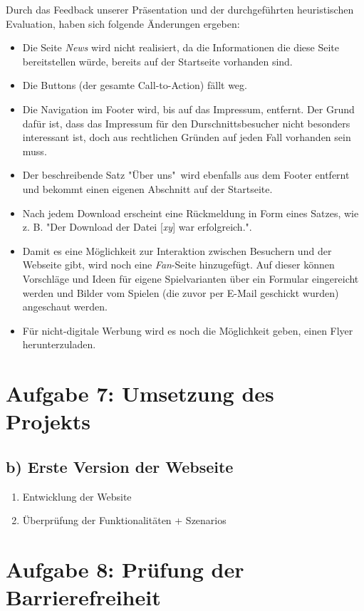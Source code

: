 \documentclass{scrartcl}
\begin{document}
Durch das Feedback unserer Präsentation und der durchgeführten heuristischen Evaluation, haben sich folgende Änderungen ergeben:
\begin{itemize}
\item Die Seite \textit{News} wird nicht realisiert, da die Informationen die diese Seite bereitstellen würde, bereits auf der Startseite vorhanden sind.
\item Die Buttons (der gesamte Call-to-Action) fällt weg.
\item Die Navigation im Footer wird, bis auf das Impressum, entfernt. Der Grund dafür ist, dass das Impressum für den Durschnittsbesucher nicht besonders interessant ist, doch aus rechtlichen Gründen auf jeden Fall vorhanden sein muss.
\item Der beschreibende Satz "Über uns"\ wird ebenfalls aus dem Footer entfernt und bekommt einen eigenen Abschnitt auf der Startseite.
\item Nach jedem Download erscheint eine Rückmeldung in Form eines Satzes, wie z. B. "Der Download der Datei [\textit{xy}] war erfolgreich.".
\item Damit es eine Möglichkeit zur Interaktion zwischen Besuchern und der Webseite gibt, wird noch eine \textit{Fan}-Seite hinzugefügt. Auf dieser können Vorschläge und Ideen für eigene Spielvarianten über ein Formular eingereicht werden und Bilder vom Spielen (die zuvor per E-Mail geschickt wurden) angeschaut werden.
\item Für nicht-digitale Werbung wird es noch die Möglichkeit geben, einen Flyer herunterzuladen.
\end{itemize}

\section*{Aufgabe 7: Umsetzung des Projekts}
\subsection*{b) Erste Version der Webseite}
\begin{enumerate}
\item Entwicklung der Website
\item Überprüfung der Funktionalitäten + Szenarios
\end{enumerate}
\section*{Aufgabe 8: Prüfung der Barrierefreiheit}
\end{document}
